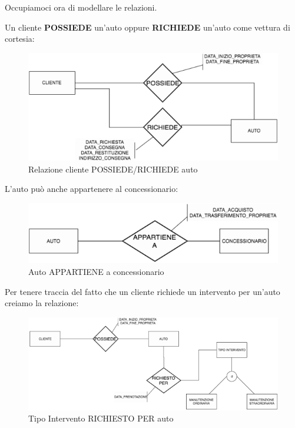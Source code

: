 Occupiamoci ora di modellare le relazioni.  

Un cliente \textbf{POSSIEDE} un’auto oppure \textbf{RICHIEDE} un’auto come vettura di cortesia:

\begin{center}
\begin{figure}[H]
\centering
\includegraphics[scale=1]{figures/cliente_auto.png}
\caption{Relazione cliente POSSIEDE/RICHIEDE auto}
\end{figure}
\end{center}

L’auto può anche appartenere al concessionario:

\begin{center}
\begin{figure}[H]
\centering
\includegraphics[scale=1]{figures/auto_appartiene_concessionario.png}
\caption{Auto APPARTIENE a concessionario}
\end{figure}
\end{center}

Per tenere traccia del fatto che un cliente richiede un intervento per un’auto creiamo la relazione: 

\begin{center}
\begin{figure}[H]
\centering
\includegraphics[scale=1]{figures/tipointervento_richiestox_auto.png}
\caption{Tipo Intervento RICHIESTO PER auto}
\end{figure}
\end{center}

